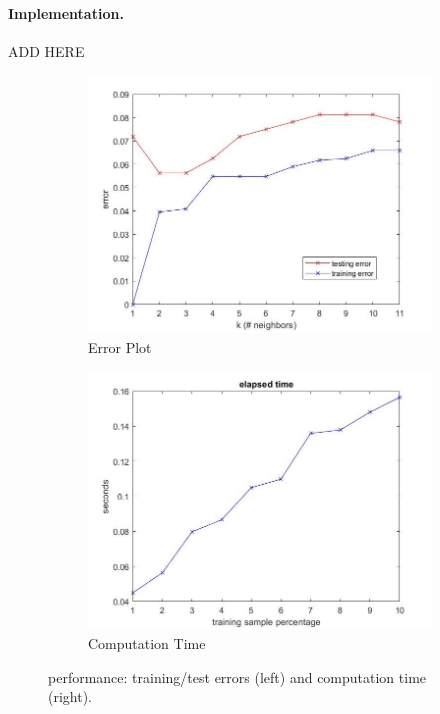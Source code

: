 \paragraph{Implementation.}
ADD HERE

\begin{figure}
	\centering
	\begin{subfigure}{.5\textwidth}
		\centering
		\includegraphics[width=.9\linewidth]{figures/knnerror.jpg}
		\caption{Error Plot}
		\label{fig:knnerror}
	\end{subfigure}%
	\begin{subfigure}{.5\textwidth}
		\centering
		\includegraphics[width=.9\linewidth]{figures/knncomp.jpg}
		\caption{Computation Time}
		\label{fig:knncomp}
	\end{subfigure}
	\caption{\knn{} performance: training/test errors (left) and 
	computation time (right).}
	\label{fig:knn}
\end{figure}

